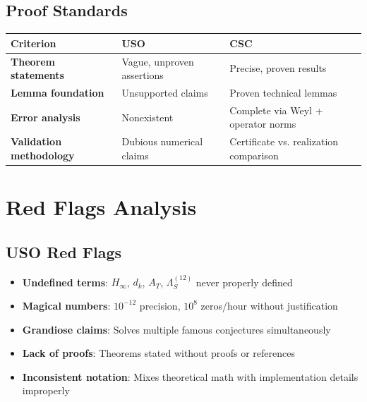 \documentclass[10pt]{article}
\begin{document}
\subsection*{Proof Standards}

\begin{table}[h!]
\centering
\begin{tabular}{L{3cm}C{4cm}C{4cm}}
\toprule
\textbf{Criterion} & \textcolor{usored}{\textbf{USO}} & \textcolor{cscgreen}{\textbf{CSC}} \\
\midrule
\textbf{Theorem statements} & Vague, unproven assertions & Precise, proven results \\
\textbf{Lemma foundation} & Unsupported claims & Proven technical lemmas \\
\textbf{Error analysis} & Nonexistent & Complete via Weyl + operator norms \\
\textbf{Validation methodology} & Dubious numerical claims & Certificate vs. realization comparison \\
\bottomrule
\end{tabular}
\end{table}

\section*{Red Flags Analysis}

\subsection*{USO Red Flags}
\begin{itemize}
\item \textcolor{redflag}{\textbf{Undefined terms}}: $H_\infty$, $d_k$, $A_T$, $\Lambda_S^{(12)}$ never properly defined
\item \textcolor{redflag}{\textbf{Magical numbers}}: $10^{-12}$ precision, $10^8$ zeros/hour without justification  
\item \textcolor{redflag}{\textbf{Grandiose claims}}: Solves multiple famous conjectures simultaneously
\item \textcolor{redflag}{\textbf{Lack of proofs}}: Theorems stated without proofs or references
\item \textcolor{redflag}{\textbf{Inconsistent notation}}: Mixes theoretical math with implementation details improperly
\end{itemize}
\end{document}
